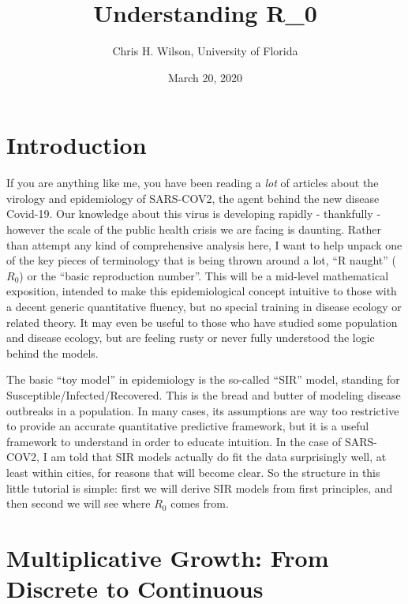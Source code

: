 \documentclass[]{article}
\title{Understanding R\_0}
\author{Chris H. Wilson, University of Florida}
\date{March 20, 2020}
\begin{document}
\maketitle

\section{Introduction}\label{introduction}

If you are anything like me, you have been reading a \emph{lot} of
articles about the virology and epidemiology of SARS-COV2, the agent
behind the new disease Covid-19. Our knowledge about this virus is
developing rapidly - thankfully - however the scale of the public health
crisis we are facing is daunting. Rather than attempt any kind of
comprehensive analysis here, I want to help unpack one of the key pieces
of terminology that is being thrown around a lot, ``R naught'' (\(R_0\))
or the ``basic reproduction number''. This will be a mid-level
mathematical exposition, intended to make this epidemiological concept
intuitive to those with a decent generic quantitative fluency, but no
special training in disease ecology or related theory. It may even be
useful to those who have studied some population and disease ecology,
but are feeling rusty or never fully understood the logic behind the
models.

The basic ``toy model'' in epidemiology is the so-called ``SIR'' model,
standing for Susceptible/Infected/Recovered. This is the bread and
butter of modeling disease outbreaks in a population. In many cases, its
assumptions are way too restrictive to provide an accurate quantitative
predictive framework, but it is a useful framework to understand in
order to educate intuition. In the case of SARS-COV2, I am told that SIR
models actually do fit the data surprisingly well, at least within
cities, for reasons that will become clear. So the structure in this
little tutorial is simple: first we will derive SIR models from first
principles, and then second we will see where \(R_0\) comes from.

\section{Multiplicative Growth: From Discrete to
Continuous}\label{multiplicative-growth-from-discrete-to-continuous}
\end{document}
